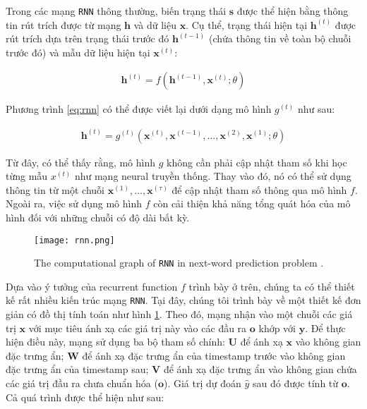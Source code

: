 Trong các mạng \verb|RNN| thông thường, biến trạng thái $\mathbf{s}$ được thể hiện bằng thông tin rút trích được từ mạng $\mathbf{h}$ và dữ liệu $\mathbf{x}$. Cụ thể, trạng thái hiện tại $\mathbf{h}^{(t)}$ được rút trích dựa trên trạng thái trước đó $\mathbf{h}^{(t-1)}$ (chứa thông tin về toàn bộ chuỗi trước đó) và mẫu dữ liệu hiện tại $\mathbf{x}^{(t)}$:

\begin{align}
    \mathbf{h}^{(t)} = f\left( \mathbf{h}^{(t-1)}, \mathbf{x}^{(t)}; \theta \right)
    \label{eq:rnn}
\end{align}

Phương trình \ref{eq:rnn} có thể được viết lại dưới dạng mô hình $g^{(t)}$ như sau:

\begin{align}
    \mathbf{h}^{(t)} = g^{(t)}\left( \mathbf{x}^{(t)}, \mathbf{x}^{(t-1)},\dots,\mathbf{x}^{(2)},\mathbf{x}^{(1)}; \theta \right)
    \label{eq:rnn_g}
\end{align}

Từ đây, có thể thấy rằng, mô hình $g$ không cần phải cập nhật tham số khi học từng mẫu $x^{(t)}$ như mạng neural truyền thống. Thay vào đó, nó có thể sử dụng thông tin từ một chuỗi $\mathbf{x}^{(1)},\dots,\mathbf{x}^{(\tau)}$ để cập nhật tham số thông qua mô hình $f$. Ngoài ra, việc sử dụng mô hình $f$ còn cải thiện khả năng tổng quát hóa của mô hình đối với những chuỗi có độ dài bất kỳ.

\begin{figure}[H]
    \centering
    \texttt{[image: rnn.png]}
    \cprotect\caption{The computational graph of \verb|RNN| in next-word prediction problem \cite{goodfellow2016deep}.}
    \label{fig:rnn}
\end{figure}

Dựa vào ý tưởng của recurrent function $f$ trình bày ở trên, chúng ta có thể thiết kế rất nhiều kiến trúc mạng \verb|RNN|. Tại đây, chúng tôi trình bày về một thiết kế đơn giản có đồ thị tính toán như hình \ref{fig:rnn}. Theo đó, mạng nhận vào một chuỗi các giá trị $\mathbf{x}$ với mục tiêu ánh xạ các giá trị này vào các đầu ra $\mathbf{o}$ khớp với $\mathbf{y}$. Để thực hiện điều này, mạng sử dụng ba bộ tham số chính: $\mathbf{U}$ để ánh xạ $\mathbf{x}$ vào không gian đặc trưng ẩn; $\mathbf{W}$ để ánh xạ đặc trưng ẩn của timestamp trước vào không gian đặc trưng ẩn của timestamp sau; $\mathbf{V}$ để ánh xạ đặc trưng ẩn vào không gian chứa các giá trị đầu ra chưa chuẩn hóa ($\mathbf{o}$). Giá trị dự đoán $\hat{y}$ sau đó được tính từ $\mathbf{o}$. Cả quá trình được thể hiện như sau:

